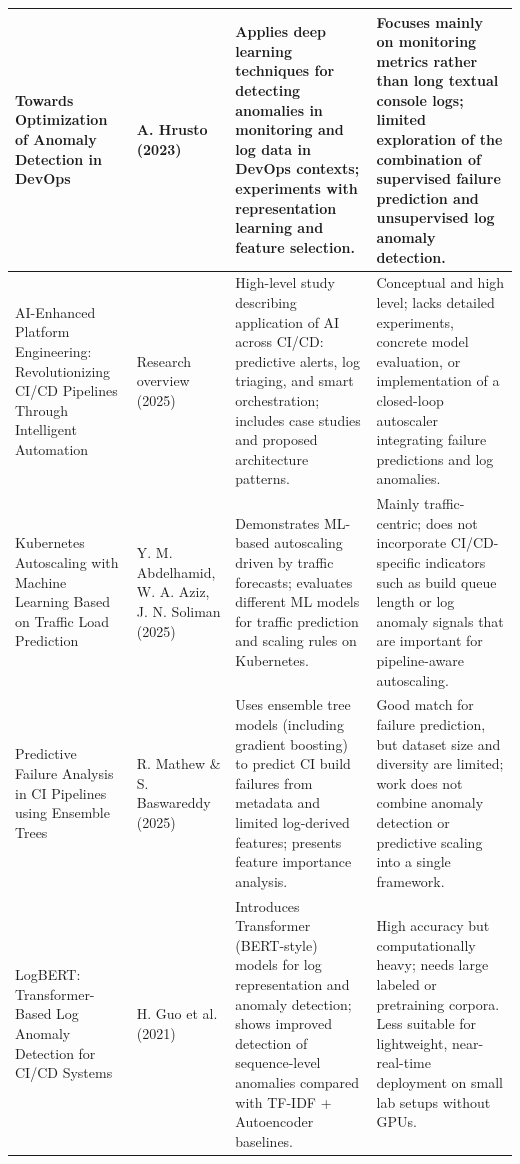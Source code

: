 \documentclass[12pt]{report}
\begin{document}
\begin{longtable}{|p{4.2cm}|p{3.2cm}|p{4.3cm}|p{3.8cm}|}
Towards Optimization of Anomaly Detection in DevOps &
A. Hrusto (2023) &
Applies deep learning techniques for detecting anomalies in monitoring and log data in DevOps contexts; experiments with representation learning and feature selection. &
Focuses mainly on monitoring metrics rather than long textual console logs; limited exploration of the combination of supervised failure prediction and unsupervised log anomaly detection. \\
\hline

AI-Enhanced Platform Engineering: Revolutionizing CI/CD Pipelines Through Intelligent Automation &
Research overview (2025) &
High-level study describing application of AI across CI/CD: predictive alerts, log triaging, and smart orchestration; includes case studies and proposed architecture patterns. &
Conceptual and high level; lacks detailed experiments, concrete model evaluation, or implementation of a closed-loop autoscaler integrating failure predictions and log anomalies.\\
\hline

Kubernetes Autoscaling with Machine Learning Based on Traffic Load Prediction &
Y. M. Abdelhamid, W. A. Aziz, J. N. Soliman (2025) &
Demonstrates ML-based autoscaling driven by traffic forecasts; evaluates different ML models for traffic prediction and scaling rules on Kubernetes. &
Mainly traffic-centric; does not incorporate CI/CD-specific indicators such as build queue length or log anomaly signals that are important for pipeline-aware autoscaling. \\
\hline

Predictive Failure Analysis in CI Pipelines using Ensemble Trees &
R. Mathew \& S. Baswareddy (2025) &
Uses ensemble tree models (including gradient boosting) to predict CI build failures from metadata and limited log-derived features; presents feature importance analysis. &
Good match for failure prediction, but dataset size and diversity are limited; work does not combine anomaly detection or predictive scaling into a single framework. \\
\hline

LogBERT: Transformer-Based Log Anomaly Detection for CI/CD Systems &
H. Guo et al. (2021) &
Introduces Transformer (BERT-style) models for log representation and anomaly detection; shows improved detection of sequence-level anomalies compared with TF-IDF + Autoencoder baselines. &
High accuracy but computationally heavy; needs large labeled or pretraining corpora. Less suitable for lightweight, near-real-time deployment on small lab setups without GPUs.\\
\hline


\end{longtable}
\end{document}
